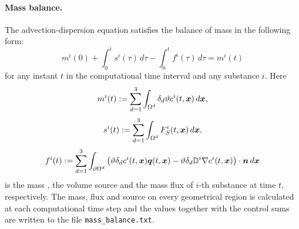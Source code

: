 \paragraph{Mass balance.}
The advection-dispersion equation satisfies the balance of mass in the following form:
$$ m^i(0) + \int_0^t s^i(\tau) \,d\tau - \int_0^t f^i(\tau) \,d\tau = m^i(t) $$
for any instant $t$ in the computational time interval and any substance $i$.
Here
$$ m^i(t) := \sum_{d=1}^3\int_{\Omega^d}\delta_d\vartheta c^i(t,\mathbf{\boldsymbol{x}})\,d\mathbf{\boldsymbol{x}}, $$
$$ s^i(t) := \sum_{d=1}^3\int_{\Omega^d}F_S^i(t,\mathbf{\boldsymbol{x}})\,d\mathbf{\boldsymbol{x}}, $$
$$ f^i(t) := \sum_{d=1}^3\int_{\partial\Omega^d}\left(\vartheta\delta_d c^i(t,\mathbf{\boldsymbol{x}})\mathbf{\boldsymbol{q}}(t,\mathbf{\boldsymbol{x}}) - \vartheta\delta_d{{\mathbb{D}}}^i\nabla c^i(t,\mathbf{\boldsymbol{x}})\right)\cdot\mathbf{\boldsymbol{n}} \,d\mathbf{\boldsymbol{x}} $$
is the mass , the volume source  and the mass flux  of $i$-th substance at time $t$, respectively.
The mass, flux and source on every geometrical region is calculated at each computational time step and the values together with the control sums are written to the file \texttt{mass\_balance.txt}.





